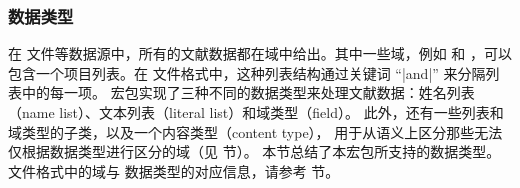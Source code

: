 \subsubsection{数据类型}
\label{bib:fld:typ}

在  文件等数据源中，所有的文献数据都在域中给出。其中一些域，例如  和 ，可以包含一个项目列表。在 \BibTeX 文件格式中，这种列表结构通过关键词 “|and|” 来分隔列表中的每一项。
\biblatex 宏包实现了三种不同的数据类型来处理文献数据：姓名列表（name list）、文本列表（literal list）和域类型（field）。
此外，还有一些列表和域类型的子类，以及一个内容类型（content type），
用于从语义上区分那些无法仅根据数据类型进行区分的域（见  节）。
本节总结了本宏包所支持的数据类型。\BibTeX 文件格式中的域与 \biblatex 数据类型的对应信息，请参考  节。

